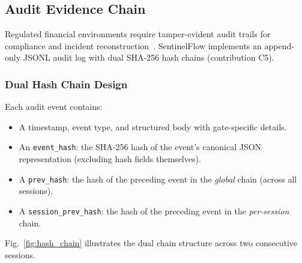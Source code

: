 \documentclass[journal,12pt,onecolumn,draftclsnofoot]{IEEEtran}
\begin{document}
\subsection{Audit Evidence Chain}
\label{Sect:Audit_Chain}

Regulated financial environments require tamper-evident audit trails for compliance and incident reconstruction~\cite{nist_ai_rmf}. SentinelFlow implements an append-only JSONL audit log with dual SHA-256 hash chains (contribution C5).

\subsubsection{Dual Hash Chain Design}

Each audit event contains:
\begin{itemize}
    \item A timestamp, event type, and structured body with gate-specific details.
    \item An \texttt{event\_hash}: the SHA-256 hash of the event's canonical JSON representation (excluding hash fields themselves).
    \item A \texttt{prev\_hash}: the hash of the preceding event in the \textit{global} chain (across all sessions).
    \item A \texttt{session\_prev\_hash}: the hash of the preceding event in the \textit{per-session} chain.
\end{itemize}

Fig.~\ref{fig:hash_chain} illustrates the dual chain structure across two consecutive sessions.
\end{document}
